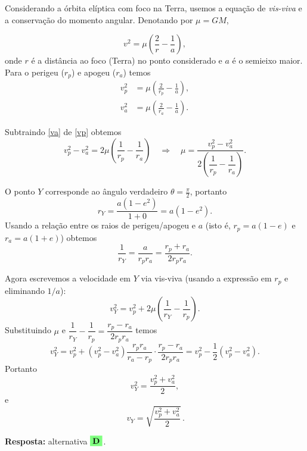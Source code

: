 \documentclass[a4paper,12pt]{article}
\begin{document}
\begin{flushleft}
Considerando a órbita elíptica com foco na Terra, usemos a equação de \emph{vis-viva} e a conservação do momento angular. Denotando por $\mu=GM$,

\[
v^2=\mu\!\left(\frac{2}{r}-\frac{1}{a}\right),
\]
onde $r$ é a distância ao foco (Terra) no ponto considerado e $a$ é o semieixo maior. Para o perigeu ($r_p$) e apogeu ($r_a$) temos
\begin{align}
v_p^2&=\mu\!\left(\frac{2}{r_p}-\frac{1}{a}\right),\label{vp}\\
v_a^2&=\mu\!\left(\frac{2}{r_a}-\frac{1}{a}\right).\label{va}
\end{align}

Subtraindo \eqref{va} de \eqref{vp} obtemos
\[
v_p^2-v_a^2=2\mu\!\left(\frac{1}{r_p}-\frac{1}{r_a}\right)
\quad\Rightarrow\quad
\mu=\frac{v_p^2-v_a^2}{2\left(\dfrac{1}{r_p}-\dfrac{1}{r_a}\right)}.
\]

O ponto $Y$ corresponde ao ângulo verdadeiro $\theta=\tfrac{\pi}{2}$, portanto
\[
r_Y=\frac{a(1-e^2)}{1+0}=a(1-e^2).
\]
Usando a relação entre os raios de perigeu/apogeu e $a$ (isto é, $r_p=a(1-e)$ e $r_a=a(1+e)$) obtemos
\[
\frac{1}{r_Y}=\frac{a}{r_pr_a}=\frac{r_p+r_a}{2r_pr_a}.
\]

Agora escrevemos a velocidade em $Y$ via vis-viva (usando a expressão em $r_p$ e eliminando $1/a$):
\[
v_Y^2=v_p^2+2\mu\!\left(\frac{1}{r_Y}-\frac{1}{r_p}\right).
\]
Substituindo $\mu$ e $\dfrac{1}{r_Y}-\dfrac{1}{r_p}=\dfrac{r_p-r_a}{2r_pr_a}$ temos
\[
v_Y^2
= v_p^2 + (v_p^2-v_a^2)\frac{r_pr_a}{r_a-r_p}\cdot\frac{r_p-r_a}{2r_pr_a}
= v_p^2 -\frac{1}{2}(v_p^2-v_a^2).
\]
Portanto
\[
v_Y^2=\frac{v_p^2+v_a^2}{2},
\]
e
\[
\boxed{\,v_Y=\sqrt{\dfrac{v_p^2+v_a^2}{2}}\,.}
\]

\textbf{Resposta:} alternativa \(\colorbox{green!50}{\textbf{D}}\).

\end{flushleft}

\newpage 
\end{document}
